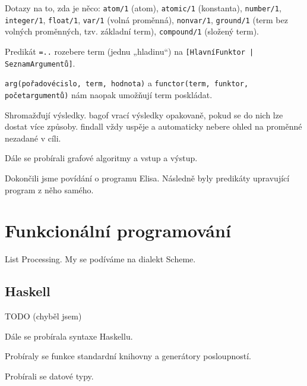 \documentclass[12pt]{article}					%
\begin{document}
\begin{definice}
	Dotazy na to, zda je něco: \verb|atom/1| (atom), \verb|atomic/1| (konstanta), \verb|number/1|, \verb|integer/1|, \verb|float/1|, \verb|var/1| (volná proměnná), \verb|nonvar/1|, \verb|ground/1| (term bez volných proměnných, tzv. základní term), \verb|compound/1| (složený term).
\end{definice}

\begin{definice}[univ]
	Predikát \verb|=..| rozebere term (jednu „hladinu“) na \verb![HlavníFunktor | SeznamArgumentů]!.
\end{definice}

\begin{definice}
	\verb|arg(pořadovécislo, term, hodnota)| a \verb|functor(term, funktor, početargumentů)| nám naopak umožňují term poskládat.
\end{definice}

\begin{definice}
	Shromažďují výsledky. bagof vrací výsledky opakovaně, pokud se do nich lze dostat více způsoby. findall vždy uspěje a automaticky nebere ohled na proměnné nezadané v cíli.
\end{definice}


Dále se probírali grafové algoritmy a vstup a výstup.


Dokončili jsme povídání o programu Elisa. Následně byly predikáty upravující program z něho samého.

\section{Funkcionální programování}
\begin{definice}[LISP]
	List Processing. My se podíváme na dialekt Scheme.
\end{definice}

\subsection{Haskell}


TODO (chyběl jsem)


\begin{poznamka}
	Dále se probírala syntaxe Haskellu.
\end{poznamka}


\begin{poznamka}
	Probíraly se funkce standardní knihovny a generátory posloupností.
\end{poznamka}


\begin{poznamka}
	Probírali se datové typy.
\end{poznamka}
	
\end{document}
